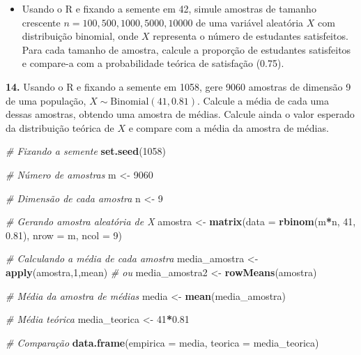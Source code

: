 \documentclass[
]{book}
\newenvironment{Shaded}{\begin{snugshade}}{\end{snugshade}}
\newcommand{\AttributeTok}[1]{\textcolor[rgb]{0.13,0.29,0.53}{#1}}
\newcommand{\CommentTok}[1]{\textcolor[rgb]{0.56,0.35,0.01}{\textit{#1}}}
\newcommand{\DecValTok}[1]{\textcolor[rgb]{0.00,0.00,0.81}{#1}}
\newcommand{\FloatTok}[1]{\textcolor[rgb]{0.00,0.00,0.81}{#1}}
\newcommand{\FunctionTok}[1]{\textcolor[rgb]{0.13,0.29,0.53}{\textbf{#1}}}
\newcommand{\NormalTok}[1]{#1}
\newcommand{\OtherTok}[1]{\textcolor[rgb]{0.56,0.35,0.01}{#1}}
\newcommand{\SpecialCharTok}[1]{\textcolor[rgb]{0.81,0.36,0.00}{\textbf{#1}}}
\providecommand{\tightlist}{%
  \setlength{\itemsep}{0pt}\setlength{\parskip}{0pt}}
\begin{document}
\begin{itemize}
\tightlist
\item
  Usando o R e fixando a semente em 42, simule amostras de tamanho
  crescente \(n = 100, 500, 1000, 5000, 10000\) de uma variável
  aleatória \(X\) com distribuição binomial, onde \(X\) representa o
  número de estudantes satisfeitos. Para cada tamanho de amostra,
  calcule a proporção de estudantes satisfeitos e compare-a com a
  probabilidade teórica de satisfação (0.75).
\end{itemize}

\textbf{14.} Usando o R e fixando a semente em 1058, gere 9060 amostras de
dimensão 9 de uma população, \(X\sim \text{Binomial}(41,0.81)\). Calcule a
média de cada uma dessas amostras, obtendo uma amostra de médias.
Calcule ainda o valor esperado da distribuição teórica de \(X\) e compare
com a média da amostra de médias.

\begin{Shaded}
\begin{Highlighting}[]
\CommentTok{\# Fixando a semente}
\FunctionTok{set.seed}\NormalTok{(}\DecValTok{1058}\NormalTok{)}

\CommentTok{\# Número de amostras}
\NormalTok{m }\OtherTok{\textless{}{-}} \DecValTok{9060}

\CommentTok{\# Dimensão de cada amostra}
\NormalTok{n }\OtherTok{\textless{}{-}} \DecValTok{9}

\CommentTok{\# Gerando amostra aleatória de X}
\NormalTok{amostra }\OtherTok{\textless{}{-}} \FunctionTok{matrix}\NormalTok{(}\AttributeTok{data =} \FunctionTok{rbinom}\NormalTok{(m}\SpecialCharTok{*}\NormalTok{n, }\DecValTok{41}\NormalTok{, }\FloatTok{0.81}\NormalTok{), }\AttributeTok{nrow =}\NormalTok{ m, }\AttributeTok{ncol =} \DecValTok{9}\NormalTok{)}

\CommentTok{\# Calculando a média de cada amostra}
\NormalTok{media\_amostra }\OtherTok{\textless{}{-}} \FunctionTok{apply}\NormalTok{(amostra,}\DecValTok{1}\NormalTok{,mean)}
\CommentTok{\# ou}
\NormalTok{media\_amostra2 }\OtherTok{\textless{}{-}} \FunctionTok{rowMeans}\NormalTok{(amostra)}

\CommentTok{\# Média da amostra de médias}
\NormalTok{media }\OtherTok{\textless{}{-}} \FunctionTok{mean}\NormalTok{(media\_amostra)}

\CommentTok{\# Média teórica}
\NormalTok{media\_teorica }\OtherTok{\textless{}{-}} \DecValTok{41}\SpecialCharTok{*}\FloatTok{0.81}

\CommentTok{\# Comparação}
\FunctionTok{data.frame}\NormalTok{(}\AttributeTok{empirica =}\NormalTok{ media, }\AttributeTok{teorica =}\NormalTok{ media\_teorica)}
\end{Highlighting}
\end{Shaded}
\end{document}
